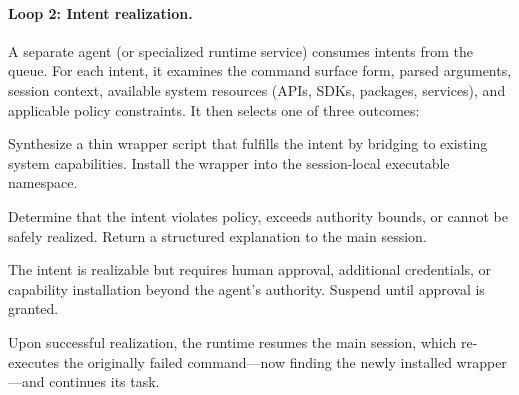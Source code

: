 \documentclass[11pt]{article}
\begin{document}
\paragraph{Loop 2: Intent realization.}
A separate agent (or specialized runtime service) consumes intents from the queue.
For each intent, it examines the command surface form, parsed arguments, session context, available system resources (APIs, SDKs, packages, services), and applicable policy constraints.
It then selects one of three outcomes:

\begin{description}[leftmargin=*]
  \item[\texttt{REALIZE}:] Synthesize a thin wrapper script that fulfills the intent by bridging to existing system capabilities. Install the wrapper into the session-local executable namespace.
  \item[\texttt{REJECT}:] Determine that the intent violates policy, exceeds authority bounds, or cannot be safely realized. Return a structured explanation to the main session.
  \item[\texttt{ESCALATE}:] The intent is realizable but requires human approval, additional credentials, or capability installation beyond the agent's authority. Suspend until approval is granted.
\end{description}

Upon successful realization, the runtime resumes the main session, which re-executes the originally failed command---now finding the newly installed wrapper---and continues its task.
\end{document}
